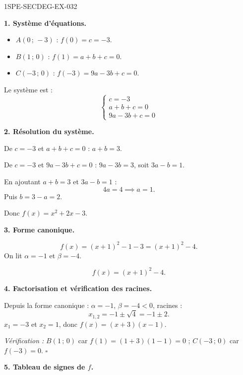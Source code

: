 \begin{corrige}{1SPE-SECDEG-EX-032}

\textbf{1. Système d'équations.}


\begin{itemize}
  \item $A(0\,;\,-3)$ : $f(0) = c = -3$.
  \item $B(1\,;\,0)$ : $f(1) = a + b + c = 0$.
  \item $C(-3\,;\,0)$ : $f(-3) = 9a - 3b + c = 0$.
\end{itemize}

Le système est :
\[\begin{cases} c = -3 \\ a + b + c = 0 \\ 9a - 3b + c = 0 \end{cases}\]

\medskip
\textbf{2. Résolution du système.}


De $c = -3$ et $a + b + c = 0$ : $a + b = 3$.

De $c = -3$ et $9a - 3b + c = 0$ : $9a - 3b = 3$, soit $3a - b = 1$.

En ajoutant $a + b = 3$ et $3a - b = 1$ :
\[4a = 4 \implies a = 1.\]
Puis $b = 3 - a = 2$.

Donc $f(x) = x^2 + 2x - 3$.

\medskip
\textbf{3. Forme canonique.}


\[f(x)=(x+1)^2-1-3=(x+1)^2-4.\]
On lit $\alpha=-1$ et $\beta=-4$.

\[f(x) = (x + 1)^2 - 4.\]

\medskip
\textbf{4. Factorisation et vérification des racines.}


Depuis la forme canonique : $\alpha = -1$, $\beta = -4 < 0$, racines :
\[x_{1,2} = -1 \pm \sqrt{4} = -1 \pm 2.\]
$x_1 = -3$ et $x_2 = 1$, donc $f(x) = (x + 3)(x - 1)$.

\textit{Vérification :} $B(1\,;\,0)$ car $f(1) = (1+3)(1-1) = 0$ ; $C(-3\,;\,0)$ car $f(-3) = 0$. \hfill $\square$

\medskip
\textbf{5. Tableau de signes de $f$.}


\end{corrige}

